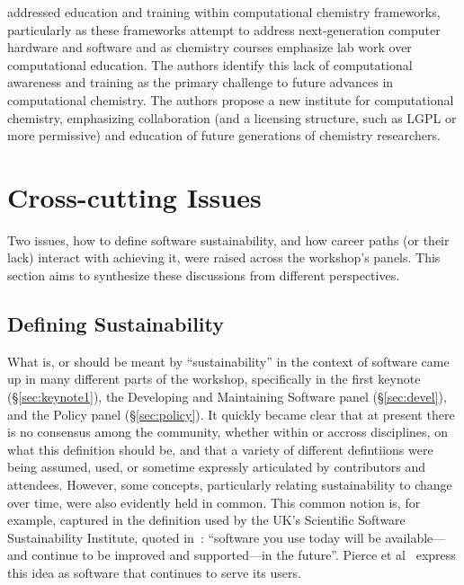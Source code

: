 \documentclass[11pt, oneside]{amsart}
\newcommand{\todo}[1]{{\color{blue}$\blacksquare$~\textsf{[TODO: #1]}}}
\newcommand{\note}[1]{ {\textcolor{red}    { #1 }}}
\begin{document}
\cite{Crawford_WSSSPE} addressed education and training within computational
chemistry frameworks, particularly as these frameworks attempt to address
next-generation computer hardware and software and as chemistry courses
emphasize lab work over computational education.  The authors identify this
lack of computational awareness and training as the primary challenge to future
advances in computational chemistry.  The authors propose a new institute for
computational chemistry, emphasizing collaboration (and a licensing structure,
such as LGPL or more permissive) and education of future generations of
chemistry researchers.

%
%
%

\section{Cross-cutting Issues} \label{sec:cross-cutting}

Two issues, how to define software sustainability, and how career
paths (or their lack) interact with achieving it, were raised across
the workshop's panels.  This section aims to synthesize these
discussions from different perspectives.

\subsection{Defining Sustainability}  \label{sec:defining-sustainability}%

What is, or should be meant by ``sustainability'' in the context of
software came up in many different parts of the workshop, specifically
in the first keynote (\S\ref{sec:keynote1}), the Developing and
Maintaining Software panel (\S\ref{sec:devel}), and the Policy panel
(\S\ref{sec:policy}). It quickly became clear that at present there is
no consensus among the community, whether within or accross
disciplines, on what this definition should be, and that a variety of
different defintiions were being assumed, used, or sometime expressly
articulated by contributors and attendees. However, some concepts,
particularly relating sustainability to change over time, were also
evidently held in common. This common notion is, for example, captured
in the definition used by the UK's Scientific Software Sustainability
Institute, quoted in~\cite{Venters_WSSSPE}: ``software you use today
will be available---and continue to be improved and supported---in the
future''. Pierce et al~\cite{Pierce_WSSSPE} express this idea as
software that continues to serve its users.
\end{document}
